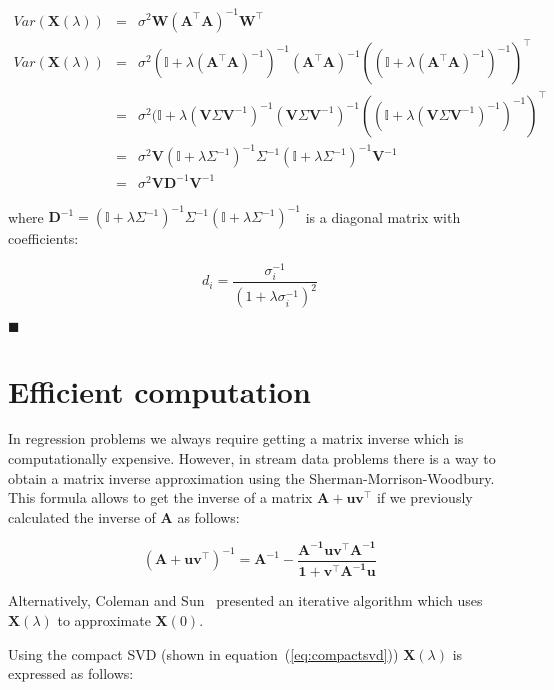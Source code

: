 \begin{eqnarray*}
Var(\mathbf{X}(\lambda)) &=& \sigma^2 \mathbf{W}(\mathbf{A}^\top \mathbf{A} )^{-1}\mathbf{W}^\top\\
Var(\mathbf{X}(\lambda)) &=& \sigma^2 (\mathbb{I} + \lambda (\mathbf{A}^\top
\mathbf{A})^{-1})^{-1} (\mathbf{A}^\top \mathbf{A} )^{-1}((\mathbb{I} + \lambda (\mathbf{A}^\top
\mathbf{A})^{-1})^{-1} )^\top \\
&=& \sigma^2 (\mathbb{I} + \lambda (\mathbf{V} \Sigma \mathbf{V}^{-1})^{-1} (\mathbf{V} \Sigma \mathbf{V}^{-1})^{-1}((\mathbb{I} + \lambda (\mathbf{V} \Sigma \mathbf{V}^{-1})^{-1})^{-1} )^\top \\
&=& \sigma^2 \mathbf{V} (\mathbb{I} + \lambda \Sigma^{-1})^{-1} \Sigma^{-1} (\mathbb{I} + \lambda \Sigma^{-1})^{-1}  \mathbf{V}^{-1}\\
&=& \sigma^2 \mathbf{V} \mathbf{D}^{-1} \mathbf{V}^{-1}
\end{eqnarray*}

\noindent where $\mathbf{D}^{-1}  = (\mathbb{I} + \lambda \Sigma^{-1})^{-1} \Sigma^{-1} (\mathbb{I} + \lambda \Sigma^{-1})^{-1}$ is a diagonal matrix with coefficients:

\begin{equation*}
d_i = \frac{\sigma_i^{-1}}{(1+\lambda\sigma_i^{-1})^2}
\end{equation*}

$\blacksquare$

\section{Efficient computation}\label{app:effcomp}
In regression problems we always require getting a matrix inverse which is
computationally expensive. However, in stream data problems there is a way to
obtain a matrix inverse approximation using the Sherman-Morrison-Woodbury. This
formula allows to get the inverse of a matrix $\mathbf{A+uv^\top}$ if we previously calculated the
inverse of $\mathbf{A}$ as follows:

\begin{equation}
\label{eq:SMW}
(\mathbf{A+uv^\top})^{-1}=\mathbf{A}^{-1}-
\frac{\mathbf{A^{-1}uv^\top A^{-1}}}{\mathbf{1+v^\top A^{-1}u}}
\end{equation}


Alternatively, Coleman and
Sun~\cite{coleman+sun2010} presented an iterative algorithm which
uses $\mathbf{X}(\lambda)$ to approximate $\mathbf{X}(0)$.


Using the compact SVD (shown in equation~(\ref{eq:compactsvd}))
$\mathbf{X}(\lambda)$ is expressed as follows:


